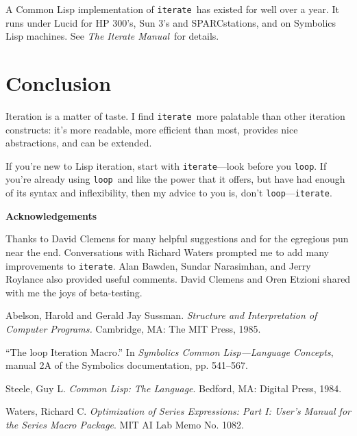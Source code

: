 \documentclass[12pt]{article}
\newcommand{\lisp}{\tt}
\newcommand{\iter}{{\lisp iterate}}
\newcommand{\looP}{{\lisp loop}}
\newcommand{\iman}{{\em The Iterate Manual\/}}
\begin{document}
A Common Lisp implementation of \iter\ has existed for well over a year.
It runs under Lucid for HP 300's, Sun 3's and SPARCstations, and on
Symbolics Lisp machines.  See \iman\ for details.

\section{Conclusion}

Iteration is a matter of taste.  I find \iter\ more palatable than
other iteration constructs: it's more readable, more efficient than
most, provides nice abstractions, and can be extended.  

If you're new to Lisp iteration, start with \iter---look before you
\looP.  If you're already using \looP\ and like the power that it
offers, but have had enough of its syntax and inflexibility, then my
advice to you is, don't \looP---\iter.

\pagebreak

\begin{flushleft}
\bf Acknowledgements
\end{flushleft}

Thanks to David Clemens for many helpful suggestions and for the
egregious pun near the end.  Conversations with Richard Waters prompted
me to add many improvements to \iter.  Alan Bawden, Sundar Narasimhan,
and Jerry Roylance also provided useful comments.  David Clemens and
Oren Etzioni shared with me the joys of beta-testing.

\begin{thebibliography}{9}

 Abelson, Harold and Gerald Jay Sussman. {\em
Structure and Interpretation of Computer Programs.} Cambridge, MA: The
MIT Press, 1985.


 ``The loop Iteration Macro.'' In {\em Symbolics Common
Lisp---Language Concepts}, manual 2A of the Symbolics documentation,
pp. 541--567.

 Steele, Guy L.  {\em Common Lisp: The Language}.
Bedford, MA: Digital Press, 1984.

 Waters, Richard C.  {\em Optimization of Series
Expressions: Part I: User's Manual for the Series Macro Package}.  MIT
AI Lab Memo No. 1082.

\end{thebibliography}
\end{document}
